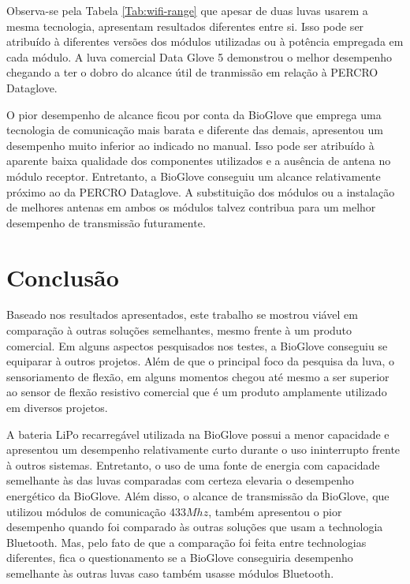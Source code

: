 \documentclass[
	12pt,				%
	openright,			%
	oneside,			%
	a4paper,			%
	english,			%
	brazil				%
	]{abntex2}
\begin{document}
			Observa-se pela Tabela \ref{Tab:wifi-range} que apesar de duas luvas usarem a mesma tecnologia, apresentam resultados diferentes entre si. Isso pode ser atribuído à diferentes versões dos módulos utilizadas ou à potência empregada em cada módulo. A luva comercial Data Glove 5 demonstrou o melhor desempenho chegando a ter o dobro do alcance útil de tranmissão em relação à PERCRO Dataglove.

			O pior desempenho de alcance ficou por conta da BioGlove que emprega uma tecnologia de comunicação mais barata e diferente das demais, apresentou um desempenho muito inferior ao indicado no manual. Isso pode ser atribuído à aparente baixa qualidade dos componentes utilizados e a ausência de antena no módulo receptor. Entretanto, a BioGlove conseguiu um alcance relativamente próximo ao da PERCRO Dataglove. A substituição dos módulos ou a instalação de melhores antenas em ambos os módulos talvez contribua para um melhor desempenho de transmissão futuramente.





		\chapter{Conclusão}
		
		Baseado nos resultados apresentados, este trabalho se mostrou viável em comparação à outras soluções semelhantes, mesmo frente à um produto comercial. Em alguns aspectos pesquisados nos testes, a BioGlove conseguiu se equiparar à outros projetos. Além de que o principal foco da pesquisa da luva, o sensoriamento de flexão, em alguns momentos chegou até mesmo a ser superior ao sensor de flexão resistivo comercial que é um produto amplamente utilizado em diversos projetos.

		A bateria LiPo recarregável utilizada na BioGlove possui a menor capacidade e apresentou um desempenho relativamente curto durante o uso ininterrupto frente à outros sistemas. Entretanto, o uso de uma fonte de energia com capacidade semelhante às das luvas comparadas com certeza elevaria o desempenho energético da BioGlove. Além disso, o alcance de transmissão da BioGlove, que utilizou módulos de comunicação 433$Mhz$, também apresentou o pior desempenho quando foi comparado às outras soluções que usam a technologia Bluetooth. Mas, pelo fato de que a comparação foi feita entre technologias diferentes, fica o questionamento se a BioGlove conseguiria desempenho semelhante às outras luvas caso também usasse módulos Bluetooth.
\end{document}
